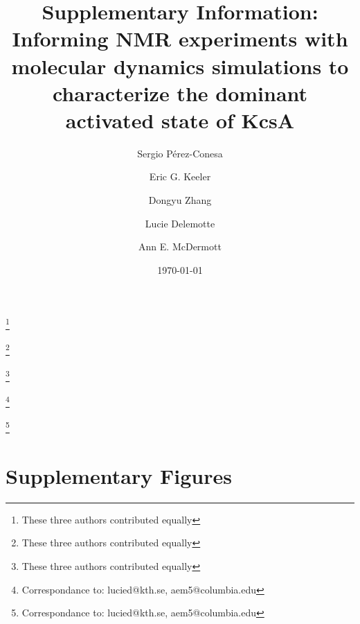 \documentclass[%
 aip,
 amsmath,amssymb,
 preprint,%
]{revtex4-1}
\begin{document}

\title[SI: The dominant activated state of KcsA]{ \large  Supplementary Information: Informing NMR experiments with molecular dynamics simulations to characterize the dominant activated state of KcsA}


\author{Sergio Pérez-Conesa}
\thanks{These three authors contributed equally}

\author{Eric G. Keeler}
\thanks{These three authors contributed equally}

\author{Dongyu Zhang}
\thanks{These three authors contributed equally}

\author{Lucie Delemotte}
\thanks{Correspondance to: lucied@kth.se, aem5@columbia.edu }

\author{Ann E. McDermott}
\thanks{Correspondance to: lucied@kth.se, aem5@columbia.edu }

\date{\today}%

\maketitle

\section{Supplementary Figures}
\end{document}
